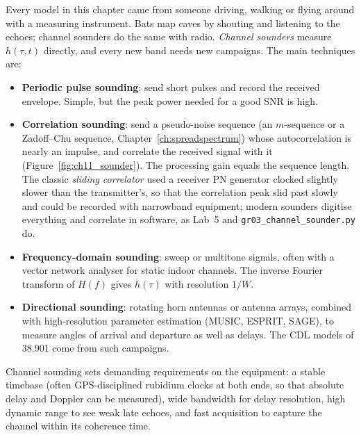 Every model in this chapter came from someone driving, walking or flying around with a
measuring instrument. Bats map caves by shouting and listening to the echoes; channel sounders do
the same with radio. \emph{Channel sounders} measure $h(\tau,t)$ directly, and every new band
needs new campaigns. The main techniques are:
\begin{itemize}
\item \textbf{Periodic pulse sounding}: send short pulses and record the received envelope. Simple,
but the peak power needed for a good SNR is high.
\item \textbf{Correlation sounding}: send a pseudo-noise sequence (an $m$-sequence or a
Zadoff--Chu sequence, Chapter~\ref{ch:spreadspectrum}) whose autocorrelation is nearly an
impulse, and correlate the received signal with it (Figure~\ref{fig:ch11_sounder}). The processing
gain equals the sequence length. The classic \emph{sliding correlator} used a receiver PN generator
clocked slightly slower than the transmitter's, so that the correlation peak slid past slowly and
could be recorded with narrowband equipment; modern sounders digitise everything and correlate in
software, as Lab~5 and \texttt{gr03\_channel\_sounder.py} do.
\item \textbf{Frequency-domain sounding}: sweep or multitone signals, often with a vector network
analyser for static indoor channels. The inverse Fourier transform of $H(f)$ gives $h(\tau)$ with
resolution $1/W$.
\item \textbf{Directional sounding}: rotating horn antennas or antenna arrays, combined with
high-resolution parameter estimation (MUSIC, ESPRIT, SAGE), to measure angles of arrival and
departure as well as delays. The CDL models of 38.901 come from such campaigns.
\end{itemize}


Channel sounding sets demanding requirements on the equipment: a stable timebase (often
GPS-disciplined rubidium clocks at both ends, so that absolute delay and Doppler can be measured),
wide bandwidth for delay resolution, high dynamic range to see weak late echoes, and fast
acquisition to capture the channel within its coherence time.

